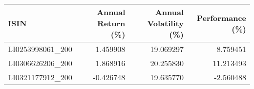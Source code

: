 \documentclass{article}
\begin{document}
\begin{tabular}{lrrr}
\toprule
ISIN & Annual Return (\%) & Annual Volatility (\%) & Performance (\%) \\
\midrule
LI0253998061_200 & 1.459908 & 19.069297 & 8.759451 \\
LI0306626206_200 & 1.868916 & 20.255830 & 11.213493 \\
LI0321177912_200 & -0.426748 & 19.635770 & -2.560488 \\
\bottomrule
\end{tabular}
\end{document}
